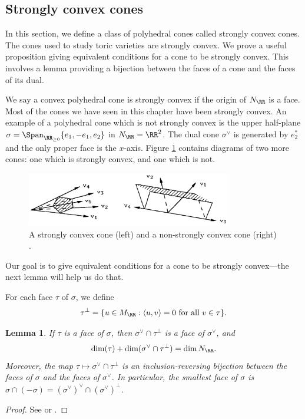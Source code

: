 \documentclass[12pt]{amsart}
\theoremstyle{plain}
\newtheorem{lemma}[theorem]{Lemma}
\begin{document}
\subsection{Strongly convex cones}
In this section, we define a class of polyhedral cones called strongly convex cones.
The cones used to study toric varieties are strongly convex.
We prove a useful proposition giving equivalent conditions for a cone to be strongly convex.
This involves a lemma providing a bijection between the faces of a cone and the faces of its dual.

We say a convex polyhedral cone is strongly convex if the origin of $N_\RR$ is a face.
Most of the cones we have seen in this chapter have been strongly convex.
An example of a polyhedral cone which is not strongly convex is the upper half-plane $\sigma = \Span_{\RR_{\ge 0}}\{e_1, -e_1, e_2\}$ in $N_\RR=\RR^2$.
The dual cone $\sigma^\vee$ is generated by $e_2^*$ and the only proper face is the $x$-axis.
Figure \ref{figure:strongconvexity} contains diagrams of two more cones: one which is strongly convex, and one which is not.

\begin{figure}[h]
\centering
\includegraphics[width=0.8\textwidth]{../images/fultons_cones}
\caption{A strongly convex cone (left) and a non-strongly convex cone (right) \cite{Fulton93}.}
\label{figure:strongconvexity}
\end{figure}

Our goal is to give equivalent conditions for a cone to be strongly convex---the next lemma will help us do that.

For each face $\tau$ of $\sigma$, we define
$$\tau^\perp = \{u \in M_\RR : \langle u, v \rangle = 0 \text{ for all } v \in \tau\}.$$

\begin{lemma}\label{lemma:dualfaces}
If $\tau$ is a face of $\sigma$, then $\sigma^\vee \cap \tau^\perp$ is a face of $\sigma^\vee$, and
$$\dim(\tau) + \dim(\sigma^\vee \cap \tau^\perp) = \dim N_\RR.$$
Moreover, the map $\tau \mapsto \sigma^\vee \cap \tau^\perp$ is an inclusion-reversing bijection between the faces of $\sigma$ and the faces of $\sigma^\vee$.
In particular, the smallest face of $\sigma$ is $\sigma \cap (-\sigma) = (\sigma^\vee)^\vee \cap (\sigma^\vee)^\perp$.
\end{lemma}
\begin{proof}
See \cite[\S 1.2]{Fulton93} or \cite[\S 1]{Zaman13}.
\end{proof}
\end{document}
